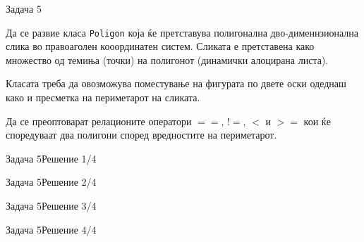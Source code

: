 \begin{frame}{Задача 5}
\begin{scriptsize}
Да се развие класа \texttt{Poligon} која ќе претставува полигонална дво-дименнзионална
слика  во правоаголен кооординатен систем. Сликата е претставена како множество
од темиња (точки) на полигонот (динамички алоцирана листа). 

Класата треба да
овозможува поместување на фигурата по двете оски одеднаш како и пресметка на
периметарот на сликата. 

Да се преоптоварат релационите оператори $==$, $!=$, $<$ и $>=$
кои ќе споредуваат два полигони според вредностите на периметарот.

\end{scriptsize}
\end{frame}

\begin{frame}[fragile]{Задача 5}{Решение 1/4}

\end{frame}
\begin{frame}[fragile,shrink=10]{Задача 5}{Решение 2/4}

\end{frame}
\begin{frame}[fragile,shrink=10]{Задача 5}{Решение 3/4}

\end{frame}
\begin{frame}[fragile]{Задача 5}{Решение 4/4}

\end{frame}